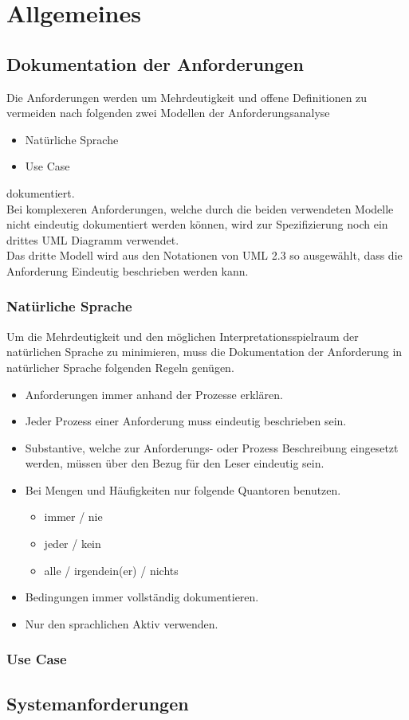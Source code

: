 \section{Allgemeines}

\subsection{Dokumentation der Anforderungen}

Die Anforderungen werden um Mehrdeutigkeit und offene Definitionen zu vermeiden nach folgenden zwei Modellen der Anforderungsanalyse

\begin{itemize}
	\item Natürliche Sprache
	\item Use Case
\end{itemize}

dokumentiert. \\
Bei komplexeren Anforderungen, welche durch die beiden verwendeten Modelle nicht eindeutig dokumentiert werden können, wird zur Spezifizierung noch ein drittes UML Diagramm verwendet. \\

Das dritte Modell wird aus den Notationen von UML 2.3 so ausgewählt, dass die Anforderung Eindeutig beschrieben werden kann.

\subsubsection{Natürliche Sprache}

Um die Mehrdeutigkeit und den möglichen Interpretationsspielraum der natürlichen Sprache zu minimieren, muss die Dokumentation der Anforderung in natürlicher Sprache folgenden Regeln genügen.

\begin{itemize}
	\item Anforderungen immer anhand der Prozesse erklären.
	\item Jeder Prozess einer Anforderung muss eindeutig beschrieben sein.
	\item Substantive, welche zur Anforderungs- oder Prozess Beschreibung eingesetzt werden, müssen über den Bezug für den Leser eindeutig sein.
	\item Bei Mengen und Häufigkeiten nur folgende Quantoren benutzen.
	\begin{itemize}
		\item immer / nie
		\item jeder / kein
		\item alle / irgendein(er) / nichts
	\end{itemize}
	\item Bedingungen immer vollständig dokumentieren.
	\item Nur den sprachlichen Aktiv verwenden.
\end{itemize}

\subsubsection{Use Case }




\subsection{Systemanforderungen}